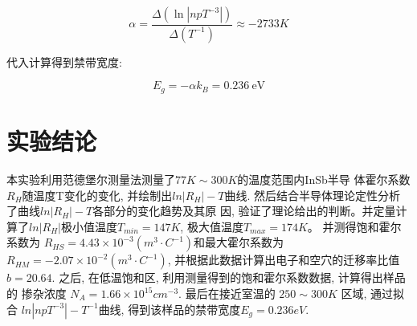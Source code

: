 \documentclass[12pt,a4paper]{article}
\newcommand{\be}[1]{
    \begin{equation}
        #1
    \end{equation}
}
\begin{document}
\be{\alpha=\frac{\Delta\left(\ln \left|n p T^{-3}\right|\right)}{\Delta\left(T^{-1}\right)} \approx-2733 K}

代入计算得到禁带宽度:
\be{E_{g}=-\alpha k_{B}=0.236 \mathrm{~eV}}

\section{实验结论}
本实验利用范德堡尔测量法测量了$77K\sim 300K$的温度范围内InSb半导
体霍尔系数$R_H$随温度T变化的变化, 并绘制出$ln|R_H|-T$曲线.
然后结合半导体理论定性分析了曲线$ln|R_H|-T$各部分的变化趋势及其原
因, 验证了理论给出的判断。并定量计算了$ln|R_H|$极小值温度$T_{min} = 147K$,
极大值温度$ T_{max} =174K $。
并测得饱和霍尔系数为 $R_{HS} = 4.43 \times 10^{-3} (m^3· C^{-1})$和最大霍尔系数为
$R_{HM} = -2.07 \times 10^{-2} (m^3· C^{-1})$, 并根据此数据计算出电子和空穴的迁移率比值
$b = 20.64$.
之后, 在低温饱和区, 利用测量得到的饱和霍尔系数数据, 计算得出样品的
掺杂浓度 $N_A = 1.66 \times 10^{15}cm^{-3}$.
最后在接近室温的 $250 \sim 300K$ 区域, 通过拟合 $ln|npT^{-3}| - T^{-1}$曲线, 得到该样品的禁带宽度$E_g = 0.236eV$.
\end{document}
